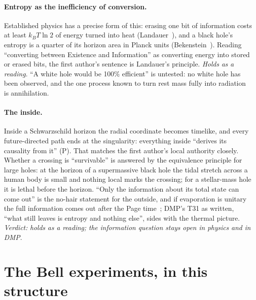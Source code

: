 \documentclass[11pt,a4paper]{article}
\theoremstyle{definition}
\theoremstyle{remark}
\newcommand{\tagP}{\textsf{(P)}}
\begin{document}
\paragraph{Entropy as the inefficiency of conversion.} Established physics has a precise form of this: erasing one bit of information
costs at least $k_BT\ln2$ of energy turned into heat (Landauer~\cite{landauer}), and a black hole's entropy is a quarter of its horizon
area in Planck units (Bekenstein~\cite{bekenstein73}). Reading ``converting between Existence and Information'' as converting energy
into stored or erased bits, the first author's sentence is Landauer's principle. \emph{Holds as a reading.} ``A white hole would be 100\%
efficient'' is untested: no white hole has been observed, and the one process known to turn rest mass fully into radiation is
annihilation.

\paragraph{The inside.} Inside a Schwarzschild horizon the radial coordinate becomes timelike, and every future-directed path ends at
the singularity: everything inside ``derives its causality from it'' \tagP. That matches the first author's local authority closely.
Whether a crossing is ``survivable'' is answered by the equivalence principle for large holes: at the horizon of a supermassive black hole
the tidal stretch across a human body is small and nothing local marks the crossing; for a stellar-mass hole it is lethal before the
horizon. ``Only the information about its total state can come out'' is the no-hair statement for the outside, and if evaporation is
unitary the full information comes out after the Page time~\cite{page}; DMP's T31 as written, ``what still leaves is entropy
and nothing else'', sides with the thermal picture. \emph{Verdict: holds as a reading; the information question stays open in physics and in DMP.}

\section{The Bell experiments, in this structure}\label{sec:bell}
\end{document}
